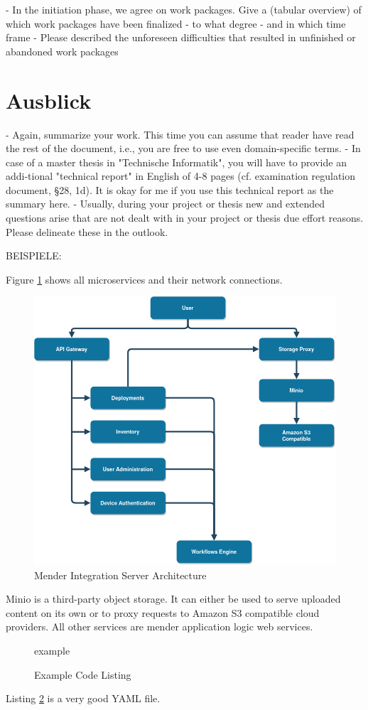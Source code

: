 - In the initiation phase, we agree on work packages. Give a (tabular overview) of which work packages have been finalized
  - to what degree
  - and in which time frame
- Please described the unforeseen difficulties that resulted in unfinished or abandoned work packages


\section{Ausblick}

- Again, summarize your work. This time you can assume that reader have read the rest of the document, i.e., you are free to use even domain-specific terms.
- In case of a master thesis in "Technische Informatik", you will have to provide an addi-tional "technical report" in English of 4-8 pages (cf. examination regulation document, §28, 1d). It is okay for me if you use this technical report as the summary here.
- Usually, during your project or thesis new and extended questions arise that are not dealt with in your project or thesis due effort reasons. Please delineate these in the outlook.

BEISPIELE:

Figure \ref{fig:mender-integration} shows all microservices and their network connections.
\begin{figure}
    \centering
    \includegraphics[scale=0.5]{images/integration-app.png}
    \caption{Mender Integration Server Architecture}
    \label{fig:mender-integration}
\end{figure}
Minio is a third-party object storage. It can either be used to serve uploaded content on its own or to proxy requests to Amazon S3 compatible cloud providers. All other services are mender application logic web services.
\newpage

\begin{figure}
    {example}
    \caption{Example Code Listing}
    \label{code:example-label}
\end{figure}

Listing \ref{code:example-label} is a very good YAML file.
